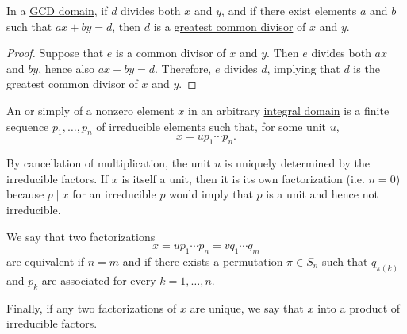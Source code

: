 \begin{proposition}\label{thm:bezouts_identity_converse}
  In a \hyperref[def:gcd_domain]{GCD domain}, if \( d \) divides both \( x \) and \( y \), and if there exist elements \( a \) and \( b \) such that \( ax + by = d \), then \( d \) is a \hyperref[def:gcd_and_lcm]{greatest common divisor} of \( x \) and \( y \).
\end{proposition}
\begin{proof}
  Suppose that \( e \) is a common divisor of \( x \) and \( y \). Then \( e \) divides both \( ax \) and \( by \), hence also \( ax + by = d \). Therefore, \( e \) divides \( d \), implying that \( d \) is the greatest common divisor of \( x \) and \( y \).
\end{proof}

\begin{definition}\label{def:irreducible_factorization}\mimprovised
  An  or simply  of a nonzero element \( x \) in an arbitrary \hyperref[def:integral_domain]{integral domain} is a finite sequence \( p_1, \ldots, p_n \) of \hyperref[def:domain_divisibility/irreducible]{irreducible elements} such that, for some \hyperref[def:divisibility/unit]{unit} \( u \),
  \begin{equation*}
    x = u p_1 \cdots p_n.
  \end{equation*}

  By cancellation of multiplication, the unit \( u \) is uniquely determined by the irreducible factors. If \( x \) is itself a unit, then it is its own factorization (i.e. \( n = 0 \)) because \( p \mid x \) for an irreducible \( p \) would imply that \( p \) is a unit and hence not irreducible.

  We say that two factorizations
  \begin{equation*}
    x = u p_1 \cdots p_n = v q_1 \cdots q_m
  \end{equation*}
  are equivalent if \( n = m \) and if there exists a \hyperref[def:symmetric_group]{permutation} \( \pi \in S_n \) such that \( q_{\pi(k)} \) and \( p_k \) are \hyperref[def:domain_divisibility/associates]{associated} for every \( k = 1, \ldots, n \).

  Finally, if any two factorizations of \( x \) are unique, we say that \( x \)  into a product of irreducible factors.
\end{definition}

